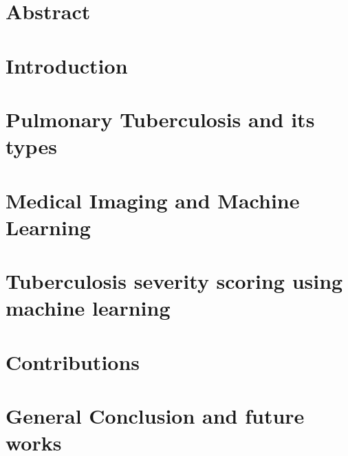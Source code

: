 \documentclass[12pt]{report}
\begin{document}
\chapter*{Abstract}


\tableofcontents
\newpage    
\printacronyms[include-classes=abbrev,name=Abbreviations]
\listoffigures
\listoftables
\chapter*{Introduction}

\chapter{Pulmonary Tuberculosis and its types}

\chapter{Medical Imaging and Machine Learning}

\chapter{Tuberculosis severity scoring using machine learning}

\chapter{Contributions}

\chapter*{General Conclusion  and future works}


\newpage
\newpage
 

\end{document}
